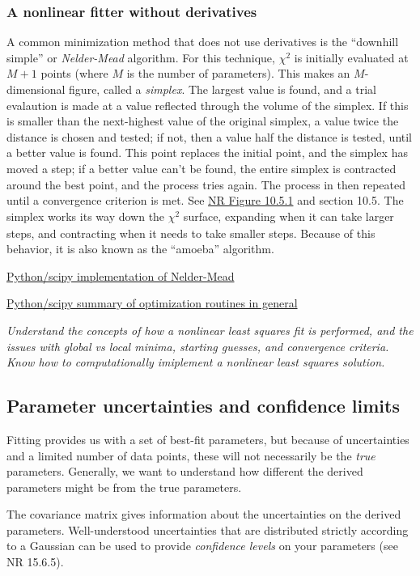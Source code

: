 \documentclass{article}
\newcommand{\test}[1]{%
    \begin{center}
        \colorbox{hl}{\parbox{0.9\textwidth}{\emph{\centering #1}}}
    \end{center}}
\begin{document}
\subsubsection{A nonlinear fitter without derivatives}
A common minimization method that does not use derivatives is the
``downhill simple'' or \emph{Nelder-Mead} algorithm.
For this technique, $\chi^{2}$ is initially evaluated at $M+1$ points
(where $M$ is the number of parameters).
This makes an $M$-dimensional figure, called a \emph{simplex}.
The largest value is found, and a trial evalaution is made at
a value reflected through the volume of the simplex. If this is
smaller than the next-highest value of the original simplex, a value
twice the distance is chosen and tested; if not, then a value half the
distance is tested, until a better value is found. This point replaces
the initial point, and the simplex has moved a step; if a better value
can't be found, the entire simplex is contracted around the best
point, and the process tries again. The process in then repeated until
a convergence criterion is met. See
\href{}
{NR Figure 10.5.1} and section 10.5.
The simplex works its way down the $ \chi^{2}_{}$ surface, expanding
when it can take larger steps, and contracting when it needs to take
smaller steps. Because of this behavior, it is also known as the
``amoeba'' algorithm.

\href{http://docs.scipy.org/doc/scipy-0.16.0/reference/generated/scipy.optimize.fmin.html}
{Python/scipy implementation of Nelder-Mead}

\href{https://docs.scipy.org/doc/scipy-0.16.1/reference/tutorial/optimize.html}
{Python/scipy summary of optimization routines in general}

\test{Understand the concepts of how a nonlinear least squares fit is
performed, and the issues with global vs local minima,
starting guesses, and convergence criteria. Know how to
computationally imiplement a nonlinear least squares solution.}

\subsection{Parameter uncertainties and confidence limits}
Fitting provides us with a set of best-fit parameters, but because of
uncertainties and a limited number of data points, these will not necessarily
be the \emph{true} parameters. Generally, we want to understand how different
the derived parameters might be from the true parameters.

The covariance matrix gives information about the uncertainties on the derived
parameters. Well-understood uncertainties that are
distributed strictly according to a Gaussian can be used to provide
\emph{confidence levels} on your parameters (see NR 15.6.5).
\end{document}
